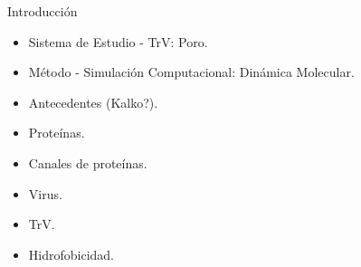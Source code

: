 \documentclass[8pt]{beamer}
\begin{document}
\begin{frame}[t]{Introducción}
\begin{itemize}
  \item Sistema de Estudio - TrV: Poro.
  \item Método - Simulación Computacional: Dinámica Molecular.
  \item Antecedentes (Kalko?).
\end{itemize}
\end{frame}


\begin{frame}[t]
\begin{itemize}
  \item Proteínas.
  \item Canales de proteínas.
  \item Virus.
  \item TrV.
  \item Hidrofobicidad.
\end{itemize}
\end{frame}
\end{document}
